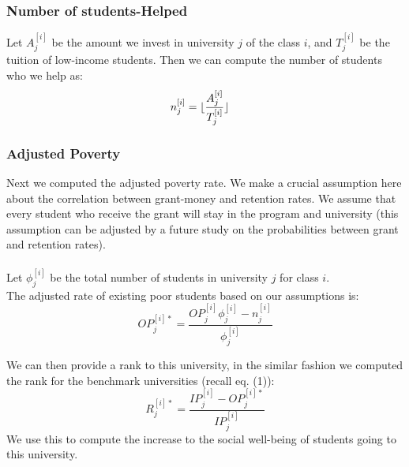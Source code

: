 \documentclass[12pt]{scrartcl}
\DeclarePairedDelimiter\floor{\lfloor}{\rfloor}
\begin{document}
	\subsubsection{Number of students-Helped}
		Let $A_j^{[i]}$ be the amount we invest in university $j$ of the class $i$, and $T_j^{[i]}$ be the tuition of low-income students. Then we can compute the number of students who we help as:
		\begin{align}
			n_j^{[i]} &= \floor{\frac{A_j^{[i]}}{T_j^{[i]}}}
		\end{align}

	\subsubsection{Adjusted Poverty}
		Next we computed the adjusted poverty rate. We make a crucial assumption here about the correlation between grant-money and retention rates. We assume that every student who receive the grant will stay in the program and university (this assumption can be adjusted by a future study on the probabilities between grant and retention rates).\\
		\\
		Let $\phi_j^{[i]}$ be the total number of students in university $j$ for class $i$.\\
		The adjusted rate of existing poor students based on our assumptions is:
		\begin{equation}
			OP_j^{[i]*} = \frac{  OP_j^{[i]}\phi_j^{[i]}-n_j^{[i]}  }{ \phi_j^{[i]}  }
		\end{equation}
		
		We can then provide a rank to this university, in the similar fashion we computed the rank for the benchmark universities (recall eq. (1)):
		$$
			R_j^{[i]*}=\frac{IP_j^{[i]}-OP_j^{[i]*}}{IP_j^{[i]}}
		$$
		We use this to compute the increase to the social well-being of students going to this university. 
\end{document}

